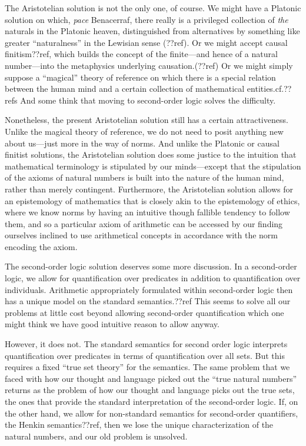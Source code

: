The Aristotelian solution is not the only one, of course. We might have a Platonic solution on which, \textit{pace} Benacerraf,
there really is a privileged collection of \textit{the} naturals in the Platonic heaven, distinguished from alternatives by 
something like greater ``naturalness'' in the Lewisian sense (??ref). Or we might accept causal finitism??ref,
which builds the concept of the finite---and hence of a natural number---into the metaphysics underlying causation.(??ref) 
Or we might simply suppose a ``magical'' theory of reference on which there is a special relation between the human 
mind and a certain collection of mathematical entities.cf.??refs And some think that moving to second-order logic solves the
difficulty.

Nonetheless, the present Aristotelian solution still has a certain attractiveness. Unlike the magical theory of reference, we do not need 
to posit anything new about us---just more in the way of norms. And unlike the Platonic or causal finitist solutions, the
Aristotelian solution does some justice to the intuition that mathematical terminology is stipulated by our minds---except 
that the stipulation of the axioms of natural numbers is built into the nature of the human mind, rather than merely contingent.
Furthermore, the Aristotelian solution allows for an epistemology of mathematics that is closely akin to the epistemology 
of ethics, where we know norms by having an intuitive though fallible tendency to follow them, and so a particular axiom of 
arithmetic can be accessed by our finding ourselves inclined to use arithmetical concepts in accordance with the norm encoding
the axiom.

The second-order logic solution deserves some more discussion. In a second-order logic, we allow
for quantification over predicates in addition to quantification over individuals. Arithmetic 
appropriately formulated within second-order logic then has a unique model on the standard 
semantics.??ref This seems to solve all our problems at little cost beyond allowing second-order
quantification which one might think we have good intuitive reason to allow anyway.

However, it does not. The standard semantics for second order logic interprets quantification 
over predicates in terms of quantification over all sets. But this requires a fixed ``true set theory''
for the semantics. The same problem that we faced with how our thought and language picked out the 
``true natural numbers'' returns as the problem of how our thought and language picks out the true sets,
the ones that provide the standard interpretation of the second-order logic. If, on the other hand, we 
allow for non-standard semantics for second-order quantifiers, the Henkin semantics??ref, then we lose 
the unique characterization of the natural numbers, and our old problem is unsolved. 

